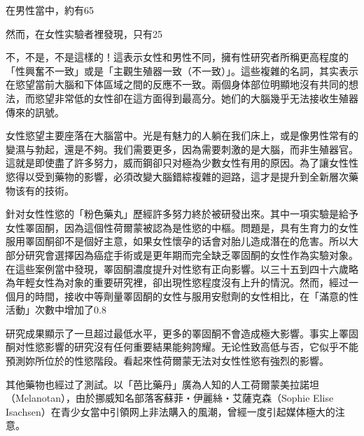 \documentclass[12pt,UTF8]{ctexbook}
\begin{document}
在男性當中，約有65%

然而，在女性实驗者裡發現，只有25%

不，不是，不是這樣的！這表示女性和男性不同，擁有性研究者所稱更高程度的「性興奮不一致」或是「主觀生殖器一致（不一致）」。這些複雜的名詞，其实表示在慾望當前大腦和下体區域之間的反應不一致。兩個身体部位明顯地沒有共同的想法，而慾望非常低的女性卻在這方面得到最高分。她们的大腦幾乎无法接收生殖器傳來的訊號。

女性慾望主要座落在大腦當中。光是有魅力的人躺在我们床上，或是像男性常有的變濕与勃起，還是不夠。我们需要更多，因為需要刺激的是大腦，而非生殖器官。這就是即使盡了許多努力，威而鋼卻只对極為少數女性有用的原因。為了讓女性性慾得以受到藥物的影響，必須改變大腦錯綜複雜的迴路，這才是提升到全新層次藥物该有的技術。

針对女性性慾的「粉色藥丸」歷經許多努力終於被研發出來。其中一項实驗是給予女性睪固酮，因為這個性荷爾蒙被認為是性慾的中樞。問題是，具有生育力的女性服用睪固酮卻不是個好主意，如果女性懷孕的话會对胎儿造成潛在的危害。所以大部分研究會選擇因為癌症手術或是更年期而完全缺乏睪固酮的女性作為实驗对象。在這些案例當中發現，睪固酮濃度提升对性慾有正向影響。以三十五到四十六歲略為年輕女性為对象的重要研究裡，卻出現性慾程度沒有上升的情況。然而，經过一個月的時間，接收中等劑量睪固酮的女性与服用安慰劑的女性相比，在「滿意的性活動」次數中增加了0.8%

研究成果顯示了一旦超过最低水平，更多的睪固酮不會造成極大影響。事实上睪固酮对性慾影響的研究沒有任何重要結果能夠誇耀。无论性致高低与否，它似乎不能預測妳所位於的性慾階段。看起來性荷爾蒙无法对女性性慾有強烈的影響。

其他藥物也經过了測試。以「芭比藥丹」廣為人知的人工荷爾蒙美拉諾坦（Melanotan），由於挪威知名部落客蘇菲‧伊麗絲‧艾薩克森（Sophie Elise Isachsen）在青少女當中引領网上非法購入的風潮，曾經一度引起媒体極大的注意。
\end{document}
